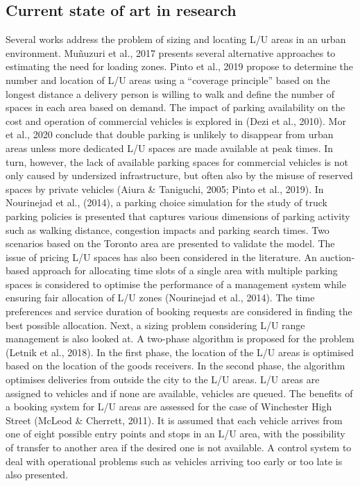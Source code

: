 \documentclass[
]{book}
\begin{document}
\hypertarget{current-state-of-art-in-research-24}{%
\subsection*{Current state of art in research}\label{current-state-of-art-in-research-24}}

Several works address the problem of sizing and locating L/U areas in an urban environment. Muñuzuri et al., 2017 presents several alternative approaches to estimating the need for loading zones. Pinto et al., 2019 propose to determine the number and location of L/U areas using a ``coverage principle'' based on the longest distance a delivery person is willing to walk and define the number of spaces in each area based on demand. The impact of parking availability on the cost and operation of commercial vehicles is explored in (Dezi et al., 2010).
Mor et al., 2020 conclude that double parking is unlikely to disappear from urban areas unless more dedicated L/U spaces are made available at peak times. In turn, however, the lack of available parking spaces for commercial vehicles is not only caused by undersized infrastructure, but often also by the misuse of reserved spaces by private vehicles (Aiura \& Taniguchi, 2005; Pinto et al., 2019).
In Nourinejad et al., (2014), a parking choice simulation for the study of truck parking policies is presented that captures various dimensions of parking activity such as walking distance, congestion impacts and parking search times. Two scenarios based on the Toronto area are presented to validate the model.
The issue of pricing L/U spaces has also been considered in the literature. An auction-based approach for allocating time slots of a single area with multiple parking spaces is considered to optimise the performance of a management system while ensuring fair allocation of L/U zones (Nourinejad et al., 2014). The time preferences and service duration of booking requests are considered in finding the best possible allocation.
Next, a sizing problem considering L/U range management is also looked at. A two-phase algorithm is proposed for the problem (Letnik et al., 2018). In the first phase, the location of the L/U areas is optimised based on the location of the goods receivers. In the second phase, the algorithm optimises deliveries from outside the city to the L/U areas. L/U areas are assigned to vehicles and if none are available, vehicles are queued. The benefits of a booking system for L/U areas are assessed for the case of Winchester High Street (McLeod \& Cherrett, 2011). It is assumed that each vehicle arrives from one of eight possible entry points and stops in an L/U area, with the possibility of transfer to another area if the desired one is not available. A control system to deal with operational problems such as vehicles arriving too early or too late is also presented.
\end{document}
